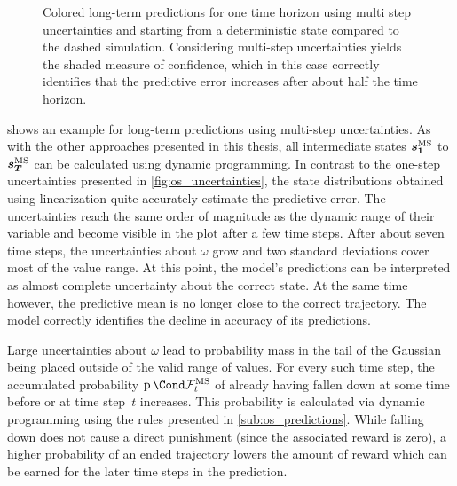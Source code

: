 \begin{figure}[t]
    \centering
    \caption[Long-term predictions using multi step uncertainties]{
        Colored long-term predictions for one time horizon using multi step uncertainties and starting from a deterministic state compared to the dashed simulation.
        Considering multi-step uncertainties yields the shaded measure of confidence, which in this case correctly identifies that the predictive error increases after about half the time horizon.
    }
    \label{fig:ms_predictions}
\end{figure}
 shows an example for long-term predictions using multi-step uncertainties.
As with the other approaches presented in this thesis, all intermediate states $\bm{s_1}^{\text{MS}}$ to $\bm{s_T}^{\text{MS}}$ can be calculated using dynamic programming.
In contrast to the one-step uncertainties presented in \cref{fig:os_uncertainties}, the state distributions obtained using linearization quite accurately estimate the predictive error.
The uncertainties reach the same order of magnitude as the dynamic range of their variable and become visible in the plot after a few time steps.
After about seven time steps, the uncertainties about $\omega$ grow and two standard deviations cover most of the value range.
At this point, the model's predictions can be interpreted as almost complete uncertainty about the correct state.
At the same time however, the predictive mean is no longer close to the correct trajectory.
The model correctly identifies the decline in accuracy of its predictions.

Large uncertainties about $\omega$ lead to probability mass in the tail of the Gaussian being placed outside of the valid range of values.
For every such time step, the accumulated probability $\Prob{\ms{\PFallen}_t}$ of already having fallen down at some time before or at time step~$t$ increases.
This probability is calculated via dynamic programming using the rules presented in \cref{sub:os_predictions}.
While falling down does not cause a direct punishment (since the associated reward is zero), a higher probability of an ended trajectory lowers the amount of reward which can be earned for the later time steps in the prediction.

